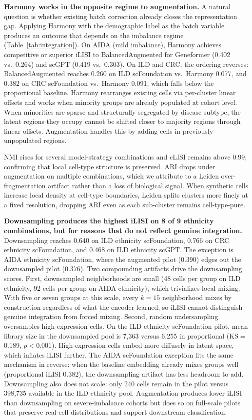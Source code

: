 \documentclass[sigconf]{acmart}
\begin{document}
\textbf{Harmony works in the opposite regime to augmentation.} A natural question is whether existing batch correction already closes the representation gap. Applying Harmony with the demographic label as the batch variable produces an outcome that depends on the imbalance regime (Table~\ref{tab:integration}). On AIDA (mild imbalance), Harmony achieves competitive or superior iLISI to BalancedAugmented for Geneformer (0.402 vs.\ 0.264) and scGPT (0.419 vs.\ 0.303). On ILD and CRC, the ordering reverses: BalancedAugmented reaches 0.260 on ILD scFoundation vs.\ Harmony 0.077, and 0.382 on CRC scFoundation vs.\ Harmony 0.091, which falls below the proportional baseline. Harmony rearranges existing cells via per-cluster linear offsets and works when minority groups are already populated at cohort level. When minorities are sparse and structurally segregated by disease subtype, the latent regions they occupy cannot be shifted closer to majority regions through linear offsets. Augmentation handles this by adding cells in previously unpopulated regions.

NMI rises for several model-strategy combinations and cLISI remains above 0.99, confirming that local cell-type structure is preserved. ARI drops under augmentation on multiple combinations, which we attribute to a Leiden over-fragmentation artifact rather than a loss of biological signal. When synthetic cells increase local density at cell-type boundaries, Leiden splits clusters more finely at a fixed resolution, dropping ARI even as each sub-cluster remains cell-type-pure.

\textbf{Downsampling produces the highest iLISI on 8 of 9 ethnicity combinations, but for reasons that do not reflect genuine integration.} Downsampling reaches 0.640 on ILD ethnicity scFoundation, 0.766 on CRC ethnicity scFoundation, and 0.468 on ILD ethnicity scGPT. The exception is AIDA ethnicity scFoundation, where the augmented pilot (0.390) edges out the downsampled pilot (0.376). Two compounding artifacts drive the downsampling scores. First, downsampled neighborhoods are small (48 cells per group on ILD ethnicity, 92 cells per group on AIDA ethnicity), which trivializes local mixing. With five or seven groups at this scale, every $k=15$ neighborhood mixes by construction regardless of what the encoder learned, so iLISI cannot distinguish genuine integration from forced mixing. Second, random undersampling oversamples high-expression cells. On the ILD ethnicity scFoundation pilot, mean library size in the downsampled pool is 7{,}363 versus 6{,}255 in proportional (KS$=$0.189, $p < 0.001$). High-expression cells embed more diffusely in latent space, which inflates iLISI further. The AIDA scFoundation exception fits the same mechanism in reverse: when the baseline embedding already mixes groups well (proportional iLISI 0.382), the downsampling artifact has less headroom to add. Downsampling also does not scale: only 240 cells remain in the pilot versus 398{,}735 available in the ILD ethnicity pool. Augmentation produces lower iLISI than downsampling on severe-imbalance cohorts but does so on full-scale pilots that preserve real-cell distributions and support downstream classification.
\end{document}

